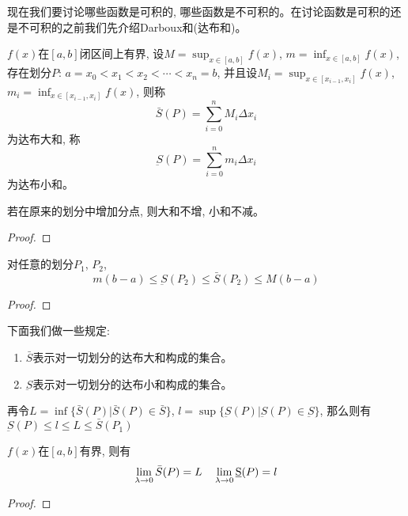 现在我们要讨论哪些函数是可积的, 哪些函数是不可积的。在讨论函数是可积的还是不可积的之前我们先介绍Darboux和(达布和)。
\begin{definition}
    $f(x)$在$[a, b]$闭区间上有界, 设$M=\sup_{x\in [a, b]} f(x)$, $m=\inf_{x\in [a, b]} f(x)$, 存在划分$P$: $a = x_0 < x_1 < x_2 < \cdots < x_n = b$, 并且设$M_i = \sup_{x\in [x_{i-1}, x_i]} f(x)$, $m_i=\inf_{x\in [x_{i-1}, x_i]} f(x)$, 则称
    \begin{equation*}
        \bar{S}(P) = \sum_{i=0}^n M_i\Delta x_i
    \end{equation*}
    为达布大和, 称
    \begin{equation*}
        \underbar{S}(P) = \sum_{i=0}^n m_i\Delta x_i
    \end{equation*}
    为达布小和。
\end{definition}

\begin{lemma}
    若在原来的划分中增加分点, 则大和不增, 小和不减。
\end{lemma}
\begin{proof}
    
\end{proof}

\begin{lemma}
    对任意的划分$P_1$, $P_2$,
    \begin{equation*}
        m(b-a) \le \underbar{S}(P_2) \le \bar{S}(P_2) \le M(b-a)
    \end{equation*}
\end{lemma}
\begin{proof}
    
\end{proof}
下面我们做一些规定:
\begin{enumerate}
    \item $\bar{S}$表示对一切划分的达布大和构成的集合。
    \item $\underbar{S}$表示对一切划分的达布小和构成的集合。
\end{enumerate}
再令$L = \inf\{\bar{S}(P) | \bar{S}(P) \in \bar{S}\}$, $l = \sup\{\underbar{S}(P) | \underbar{S}(P) \in \underbar{S}\}$, 那么则有$\underbar{S}(P) \le l \le L \le \bar{S}(P_1)$

\begin{theorem}[Darboux定理]
    $f(x)$在$[a, b]$有界, 则有
    \begin{equation*}
        \lim_{\lambda \to 0 } \bar{S}(P) = L \quad \lim_{\lambda \to 0 } \underbar{S}(P) = l
    \end{equation*}
\end{theorem}
\begin{proof}
    
\end{proof}

